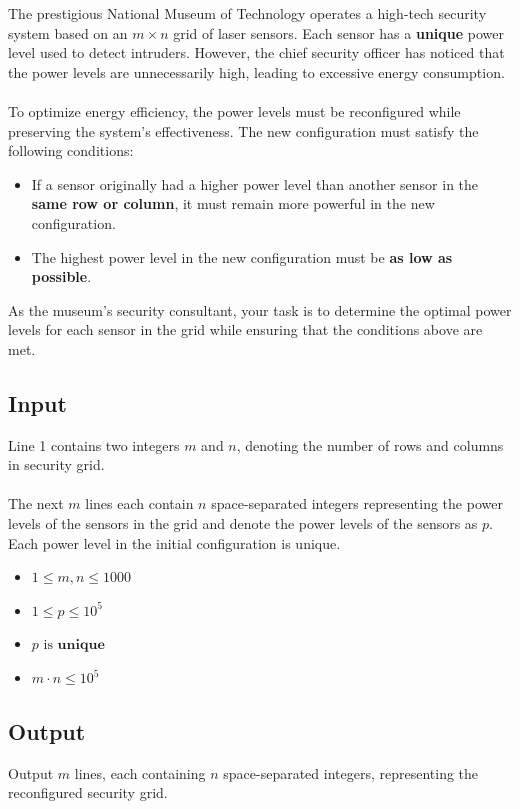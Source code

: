 \documentclass[12pt,a4paper]{article}
\begin{document}
\noindent
The prestigious National Museum of Technology operates a high-tech security system based on an \(m \times n\) grid of laser sensors. Each sensor has a \textbf{unique} power level used to detect intruders. However, the chief security officer has noticed that the power levels are unnecessarily high, leading to excessive energy consumption.
\\\\
\noindent
To optimize energy efficiency, the power levels must be reconfigured while preserving the system's effectiveness. The new configuration must satisfy the following conditions:
\begin{itemize}
    \item If a sensor originally had a higher power level than another sensor in the \textbf{same row or column}, it must remain more powerful in the new configuration.
    \item The highest power level in the new configuration must be \textbf{as low as possible}.
\end{itemize}

\noindent
As the museum's security consultant, your task is to determine the optimal power levels for each sensor in the grid while ensuring that the conditions above are met.

\subsection*{\fontsize{16}{12}Input}
Line 1 contains two integers \(m\) and \(n\), denoting the number of rows and columns in security grid.
\\\\
\noindent
The next \(m\) lines each contain \(n\) space-separated integers representing the power levels of the sensors in the grid and denote the power levels of the sensors as $p$. Each power level in the initial configuration is unique.
\begin{itemize}
    \item \(1 \leq m, n \leq 1000\)
    \item $1\leq p \leq 10^5$
    \item $p \text{ is }\textbf{unique}$
    \item \(m \cdot n \leq 10^5\)
\end{itemize}
\subsection*{\fontsize{16}{12}Output}
Output \(m\) lines, each containing \(n\) space-separated integers, representing the reconfigured security grid.
\end{document}
